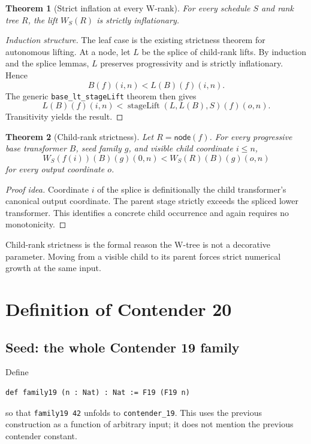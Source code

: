 \documentclass[11pt]{article}
\newtheorem{theorem}{Theorem}[section]
\theoremstyle{definition}
\newcommand{\code}[1]{\texttt{#1}}
\begin{document}
\begin{theorem}[Strict inflation at every W-rank]
For every schedule \(S\) and rank tree \(R\), the lift \(W_S(R)\) is strictly
inflationary.
\end{theorem}

\begin{proof}[Induction structure]
The leaf case is the existing strictness theorem for autonomous lifting.  At a
node, let \(L\) be the splice of child-rank lifts.  By induction and the splice
lemmas, \(L\) preserves progressivity and is strictly inflationary.  Hence
\[
  B(f)(i,n)<L(B)(f)(i,n).
\]
The generic \code{base\_lt\_stageLift} theorem then gives
\[
  L(B)(f)(i,n)
  <\operatorname{stageLift}(L,L(B),S)(f)(o,n).
\]
Transitivity yields the result.
\end{proof}

\begin{theorem}[Child-rank strictness]
Let \(R=\mathsf{node}(f)\).  For every progressive base transformer \(B\), seed
family \(g\), and visible child coordinate \(i\leq n\),
\[
  W_S(f(i))(B)(g)(0,n)
  < W_S(R)(B)(g)(o,n)
\]
for every output coordinate \(o\).
\end{theorem}

\begin{proof}[Proof idea]
Coordinate \(i\) of the splice is definitionally the child transformer's
canonical output coordinate.  The parent stage strictly exceeds the spliced
lower transformer.  This identifies a concrete child occurrence and again
requires no monotonicity.
\end{proof}

Child-rank strictness is the formal reason the W-tree is not a decorative
parameter.  Moving from a visible child to its parent forces strict numerical
growth at the same input.

\section{Definition of Contender 20}

\subsection{Seed: the whole Contender 19 family}

Define
\begin{lstlisting}
def family19 (n : Nat) : Nat := F19 (F19 n)
\end{lstlisting}
so that \code{family19 42} unfolds to \code{contender\_19}.  This uses the
previous construction as a function of arbitrary input; it does not mention
the previous contender constant.
\end{document}
